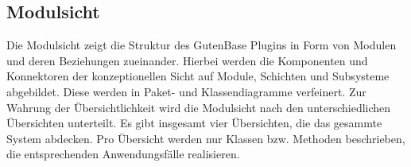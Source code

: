 	
	
	
	
	
	\subsection{Modulsicht}
	Die Modulsicht zeigt die Struktur des GutenBase Plugins in Form von Modulen und deren Beziehungen zueinander. Hierbei werden die Komponenten und Konnektoren der konzeptionellen Sicht auf Module, Schichten und Subsysteme abgebildet. Diese werden in Paket- und Klassendiagramme verfeinert.
	Zur Wahrung der Übersichtlichkeit wird die Modulsicht nach den unterschiedlichen Übersichten unterteilt. Es gibt insgesamt vier Übersichten, die das gesammte System abdecken. Pro Übersicht werden nur Klassen bzw. Methoden beschrieben, die entsprechenden Anwendungsfälle realisieren.
	

